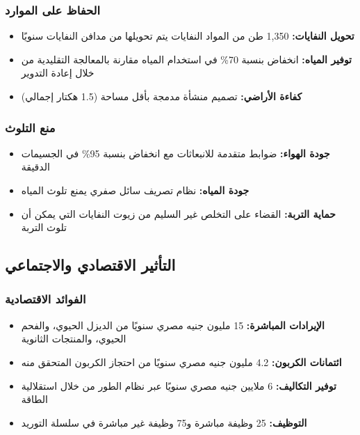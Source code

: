 \subsubsection{الحفاظ على الموارد}
\begin{itemize}
    \item \textbf{تحويل النفايات:} 1,350 طن من المواد النفايات يتم تحويلها من مدافن النفايات سنويًا
    \item \textbf{توفير المياه:} انخفاض بنسبة 70\% في استخدام المياه مقارنة بالمعالجة التقليدية من خلال إعادة التدوير
    \item \textbf{كفاءة الأراضي:} تصميم منشأة مدمجة بأقل مساحة (1.5 هكتار إجمالي)
\end{itemize}

\subsubsection{منع التلوث}
\begin{itemize}
    \item \textbf{جودة الهواء:} ضوابط متقدمة للانبعاثات مع انخفاض بنسبة 95\% في الجسيمات الدقيقة
    \item \textbf{جودة المياه:} نظام تصريف سائل صفري يمنع تلوث المياه
    \item \textbf{حماية التربة:} القضاء على التخلص غير السليم من زيوت النفايات التي يمكن أن تلوث التربة
\end{itemize}

\subsection{التأثير الاقتصادي والاجتماعي}

\subsubsection{الفوائد الاقتصادية}
\begin{itemize}
    \item \textbf{الإيرادات المباشرة:} 15 مليون جنيه مصري سنويًا من الديزل الحيوي، والفحم الحيوي، والمنتجات الثانوية
    \item \textbf{ائتمانات الكربون:} 4.2 مليون جنيه مصري سنويًا من احتجاز الكربون المتحقق منه
    \item \textbf{توفير التكاليف:} 6 ملايين جنيه مصري سنويًا عبر نظام الطور من خلال استقلالية الطاقة
    \item \textbf{التوظيف:} 25 وظيفة مباشرة و75 وظيفة غير مباشرة في سلسلة التوريد
\end{itemize}

